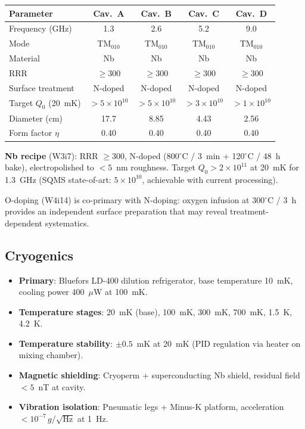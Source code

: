 \documentclass[11pt]{article}
\newcommand{\ee}[1]{\times 10^{#1}}
\begin{document}
\begin{center}
\renewcommand{\arraystretch}{1.2}
\begin{tabular}{@{}lcccc@{}}
\toprule
\textbf{Parameter} & \textbf{Cav.~A} & \textbf{Cav.~B} &
  \textbf{Cav.~C} & \textbf{Cav.~D} \\
\midrule
Frequency (GHz) & 1.3 & 2.6 & 5.2 & 9.0 \\
Mode & TM$_{010}$ & TM$_{010}$ & TM$_{010}$ & TM$_{010}$ \\
Material & Nb & Nb & Nb & Nb \\
RRR & $\geq 300$ & $\geq 300$ & $\geq 300$ & $\geq 300$ \\
Surface treatment & N-doped & N-doped & N-doped & N-doped \\
Target $Q_0$ (20~mK) & $> 5\ee{10}$ & $> 5\ee{10}$ & $> 3\ee{10}$ &
  $> 1\ee{10}$ \\
Diameter (cm) & 17.7 & 8.85 & 4.43 & 2.56 \\
Form factor $\eta$ & 0.40 & 0.40 & 0.40 & 0.40 \\
\bottomrule
\end{tabular}
\end{center}

\textbf{Nb recipe} (W3i7): RRR $\geq 300$, N-doped (800$^\circ$C /
3~min + 120$^\circ$C / 48~h bake), electropolished to $< 5$~nm
roughness. Target $Q_0 > 2\ee{11}$ at 20~mK for 1.3~GHz (SQMS
state-of-art: $5\ee{10}$, achievable with current processing).

O-doping (W4i14) is co-primary with N-doping: oxygen infusion at
300$^\circ$C / 3~h provides an independent surface preparation that
may reveal treatment-dependent systematics.

\subsection{Cryogenics}

\begin{itemize}[nosep]
\item \textbf{Primary}: Bluefors LD-400 dilution refrigerator, base
  temperature 10~mK, cooling power 400~$\mu$W at 100~mK.
\item \textbf{Temperature stages}: 20~mK (base), 100~mK, 300~mK,
  700~mK, 1.5~K, 4.2~K.
\item \textbf{Temperature stability}: $\pm 0.5$~mK at 20~mK (PID
  regulation via heater on mixing chamber).
\item \textbf{Magnetic shielding}: Cryoperm + superconducting Nb
  shield, residual field $< 5$~nT at cavity.
\item \textbf{Vibration isolation}: Pneumatic legs + Minus-K platform,
  acceleration $< 10^{-7}\,g/\sqrt{\text{Hz}}$ at 1~Hz.
\end{itemize}
\end{document}
